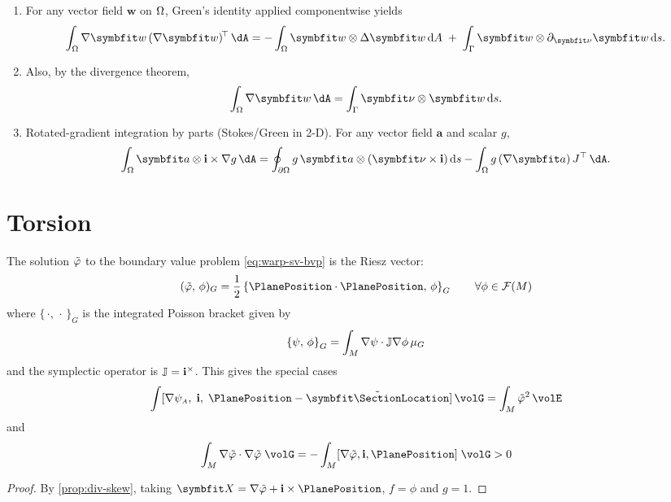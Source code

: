\begin{enumerate}
\item For any vector field \(\bm w\) on \(\Omega\), Green’s identity applied componentwise yields
\begin{equation}
\int_{\Section}\nabla\bm w\,(\nabla\bm w)^{\!\top}\,\dA
= -\int_{\Section}\bm w\otimes \Delta\bm w\,\mathrm dA
\;+\;\int_{\SectionBoundary}\bm w\otimes \partial_{\bm\nu}\bm w\,\mathrm ds.
\label{eq:thm-green-vec}
\end{equation}
\item Also, by the divergence theorem,
\begin{equation}
\int_{\Section}\nabla\bm w\,\dA
=\int_{\SectionBoundary}\bm\nu\otimes\bm w\,\mathrm ds.
\label{eq:div-thm-vec}
\end{equation}
\item Rotated-gradient integration by parts (Stokes/Green in 2-D). For any vector field \(\bm a\) and scalar \(g\),
\begin{equation}
\int_{\Section}\bm a\otimes\FrameBasis\times\nabla g\,\dA
=\oint_{\partial\Section} g\,\bm a\otimes(\bm\nu\times\FrameBasis)\,\mathrm ds
-\int_{\Section} g\,(\nabla\bm a)\,J^{\top}\,\dA.
\label{eq:thm-stokes-green}
\end{equation}
\end{enumerate}
\fi 

\section{Torsion}
\begin{proposition}
\label{prop:armero-81}
The solution \(\tilde{\varphi}\) to the boundary value problem \eqref{eq:warp-sv-bvp} is the Riesz vector:
\begin{equation}
    (\WarpSV,\, \phi)_G =  \frac{1}{2} \left\{\PlanePosition \cdot \PlanePosition,\, \phi\right\}_G %
    \qquad \forall \phi \in \mathcal{F}(\PlaneManifold)
\end{equation}
where \(\{\,\cdot,\,\cdot\,\}_G\) is the integrated Poisson bracket \citep{arnold1978mathematical} given by 
\[
\left\{\psi,\, \phi\right\}_G = \int_{M} \nabla \psi \cdot \mathbb{J} \nabla \phi \, \mu_G
\]
and the symplectic operator is \(\mathbb{J} = \mathbf{i}^{\times}\).
This gives the special cases 
%
\begin{equation}
\int [ \nabla \WarpFA,\; \FrameBasis,\; \PlanePosition - \tilde{\bm{\SectionLocation}} ] \, \volG
= \int_{\PlaneManifold} \WarpSV^2 \, \volE %
\label{eq:FA81b}
\end{equation}
and
\begin{equation}
\int_{\PlaneManifold} \nabla \WarpSV \cdot \nabla \WarpSV \; \volG 
= - \int_{\PlaneManifold} [\nabla \WarpSV, \FrameBasis, \PlanePosition] \; \volG > 0
\label{eq:FA103}
\end{equation}
\end{proposition}
\begin{proof}
By \cref{prop:div-skew}, taking \(\bm{X} = \nabla \WarpSV + \FrameBasis \times \PlanePosition\), \(f = \phi\) and \(g = 1\).
\end{proof}

